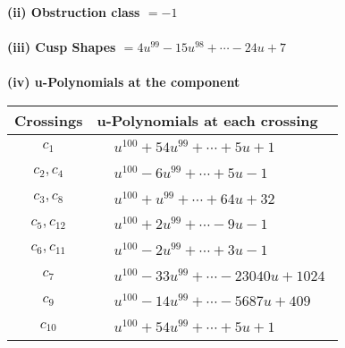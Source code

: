 \documentclass[1p]{elsarticle_modified}
\theoremstyle{definition}
\begin{document}
\flushleft \textbf{(ii) Obstruction class $= -1$}\\~\\
\flushleft \textbf{(iii) Cusp Shapes $= 4 u^{99}-15 u^{98}+\cdots-24 u+7$}\\~\\
\newpage\renewcommand{\arraystretch}{1}
\flushleft \textbf{(iv) u-Polynomials at the component}\newline \\
\begin{tabular}{m{50pt}|m{274pt}}
Crossings & \hspace{64pt}u-Polynomials at each crossing \\
\hline $$\begin{aligned}c_{1}\end{aligned}$$&$\begin{aligned}
&u^{100}+54 u^{99}+\cdots+5 u+1
\end{aligned}$\\
\hline $$\begin{aligned}c_{2},c_{4}\end{aligned}$$&$\begin{aligned}
&u^{100}-6 u^{99}+\cdots+5 u-1
\end{aligned}$\\
\hline $$\begin{aligned}c_{3},c_{8}\end{aligned}$$&$\begin{aligned}
&u^{100}+u^{99}+\cdots+64 u+32
\end{aligned}$\\
\hline $$\begin{aligned}c_{5},c_{12}\end{aligned}$$&$\begin{aligned}
&u^{100}+2 u^{99}+\cdots-9 u-1
\end{aligned}$\\
\hline $$\begin{aligned}c_{6},c_{11}\end{aligned}$$&$\begin{aligned}
&u^{100}-2 u^{99}+\cdots+3 u-1
\end{aligned}$\\
\hline $$\begin{aligned}c_{7}\end{aligned}$$&$\begin{aligned}
&u^{100}-33 u^{99}+\cdots-23040 u+1024
\end{aligned}$\\
\hline $$\begin{aligned}c_{9}\end{aligned}$$&$\begin{aligned}
&u^{100}-14 u^{99}+\cdots-5687 u+409
\end{aligned}$\\
\hline $$\begin{aligned}c_{10}\end{aligned}$$&$\begin{aligned}
&u^{100}+54 u^{99}+\cdots+5 u+1
\end{aligned}$\\
\hline
\end{tabular}\\~\\
\end{document}
